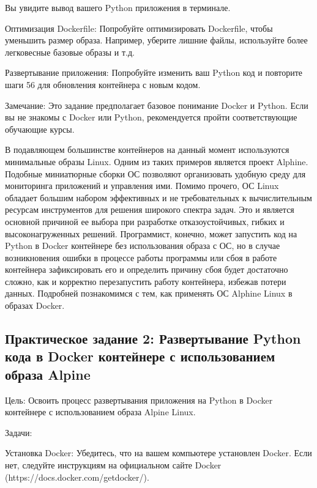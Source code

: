 \documentclass[letterpaper,10pt,russian]{sphinxmanual}
\begin{document}
\sphinxAtStartPar
Вы увидите вывод вашего Python приложения в терминале.

\sphinxAtStartPar
Оптимизация Dockerfile: Попробуйте оптимизировать Dockerfile, чтобы уменьшить размер образа. Например, уберите лишние файлы, используйте более легковесные базовые образы и т.д.

\sphinxAtStartPar
Развертывание приложения: Попробуйте изменить ваш Python код и повторите шаги 5\sphinxhyphen{}6 для обновления контейнера с новым кодом.

\sphinxAtStartPar
Замечание: Это задание предполагает базовое понимание Docker и Python. Если вы не знакомы с Docker или Python, рекомендуется пройти соответствующие обучающие курсы.

\sphinxAtStartPar
В подавляющем большинстве контейнеров на данный момент используются минимальные образы Linux. Одним из таких примеров является проект Alphine. Подобные миниатюрные сборки ОС позволяют организовать удобную среду для мониторинга приложений и управления ими. Помимо прочего, ОС Linux обладает большим набором эффективных и не требовательных к вычислительным ресурсам инструментов для решения широкого спектра задач. Это и является основной причиной ее выбора при разработке отказоустойчивых, гибких и высоконагруженных решений. Программист, конечно, может запустить код на Python в Docker контейнере без использования образа с ОС, но в случае возникновения ошибки в процессе работы программы или сбоя в работе контейнера зафиксировать его и определить причину сбоя будет достаточно сложно, как и корректно перезапустить работу контейнера, избежав потери данных. Подробней познакомимся с тем, как применять ОС Alphine Linux в образах Docker.


\subsection{Практическое задание 2: Развертывание Python кода в Docker контейнере с использованием образа Alpine}
\label{\detokenize{educational_materials/docker_base/exercises:python-docker-alpine}}
\sphinxAtStartPar
Цель: Освоить процесс развертывания приложения на Python в Docker контейнере с использованием образа Alpine Linux.

\sphinxAtStartPar
Задачи:

\sphinxAtStartPar
Установка Docker: Убедитесь, что на вашем компьютере установлен Docker. Если нет, следуйте инструкциям на официальном сайте Docker (https://docs.docker.com/get\sphinxhyphen{}docker/).
\end{document}
